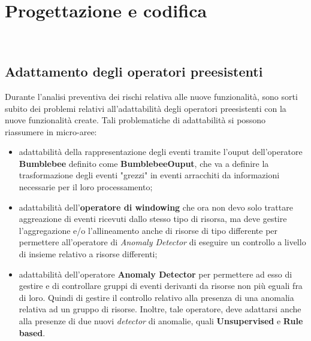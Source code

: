 
\chapter{Progettazione e codifica}
\label{cap:progettazione-codifica}

\\

\section{Adattamento degli operatori preesistenti}
Durante l'analisi preventiva dei rischi relativa alle nuove funzionalità, sono sorti subito dei problemi relativi all'adattabilità degli operatori preesistenti con la nuove funzionalità create. Tali problematiche di adattabilità si possono riassumere in micro-aree:

\begin{itemize}
	\item{adattabilità della rappresentazione degli eventi tramite l'ouput dell'operatore \textbf{Bumblebee} definito come \textbf{BumblebeeOuput}, che va a definire la trasformazione degli eventi "grezzi" in eventi arracchiti da informazioni necessarie per il loro processamento;}
	\item{adattabilità dell'\textbf{operatore di windowing} che ora non devo solo trattare aggreazione di eventi ricevuti dallo stesso tipo di risorsa, ma deve gestire l'aggregazione e/o l'allineamento anche di risorse di tipo differente per permettere all'operatore di \textit{Anomaly Detector} di eseguire un controllo a livello di insieme relativo a risorse differenti;}
	\item{adattabilità dell'operatore \textbf{Anomaly Detector} per permettere ad esso di gestire e di controllare gruppi di eventi derivanti da risorse non più eguali fra di loro. Quindi di gestire il controllo relativo alla presenza di una anomalia relativa ad un gruppo di risorse. Inoltre, tale operatore, deve adattarsi anche alla presenze di due nuovi \textit{detector} di anomalie, quali \textbf{Unsupervised} e \textbf{Rule based}.}
\end{itemize}
	
